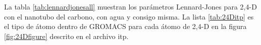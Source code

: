     
    




La tabla \ref{tab:lennardjonesall} muestran los parámetros Lennard-Jones para 2,4-D con el nanotubo del carbono, con agua y consigo misma. La lista \ref{tab:24Ditp} es el tipo de átomo dentro de GROMACS para cada átomo de 2,4-D en la figura \ref{fig:24Dfigure} descrito en el archivo itp.

